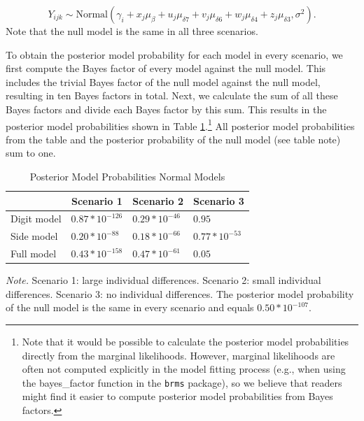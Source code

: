 \documentclass[
  english,
  doc,floatsintext]{apa6}
\begin{document}
\begin{equation}
Y_{ijk} \sim \text{Normal}(\gamma_{i} + x_j \mu_\beta + u_j \mu_{\delta{7}} + v_j \mu_{\delta{6}} + w_j \mu_{\delta{4}} + z_j \mu_{\delta{3}}, \sigma^2). \label{eq:datalevel2}
\end{equation}
Note that the null model is the same in all three scenarios.

To obtain the posterior model probability for each model in every scenario, we first compute the Bayes factor of every model against the null model. This includes the trivial Bayes factor of the null model against the null model, resulting in ten Bayes factors in total. Next, we calculate the sum of all these Bayes factors and divide each Bayes factor by this sum. This results in the posterior model probabilities shown in Table \ref{tab:postmodprob}.\footnote{Note that it would be possible to calculate the posterior model probabilities directly from the marginal likelihoods. However, marginal likelihoods are often not computed explicitly in the model fitting process (e.g., when using the bayes\_factor function in the \texttt{brms} package), so we believe that readers might find it easier to compute posterior model probabilities from Bayes factors.} All posterior model probabilities from the table and the posterior probability of the null model (see table note) sum to one.

\begin{table}[H]
\caption{Posterior Model Probabilities Normal Models}
\label{tab:postmodprob}
\begin{tabularx}{\textwidth}{XXXX}
\toprule
 & \multicolumn{1}{c}{Scenario 1} & \multicolumn{1}{c}{Scenario 2} & \multicolumn{1}{c}{Scenario 3}\\
\midrule
Digit model & $0.87*10^{-126}$ & $0.29*10^{-46}$ & $0.95$\\
Side model & $0.20*10^{-88}$ & $0.18*10^{-66}$ & $0.77*10^{-53}$ \\
Full model & $0.43*10^{-158}$ & $0.47*10^{-61}$ & $0.05$\\
\bottomrule
\end{tabularx}
\begin{tablenotes}[para]
\textit{Note.} Scenario 1: large individual differences. Scenario 2: small individual differences. Scenario 3: no individual differences. The posterior model probability of the null model is the same in every scenario and equals $0.50*10^{-107}$. 
\end{tablenotes}
\end{table}
\end{document}
